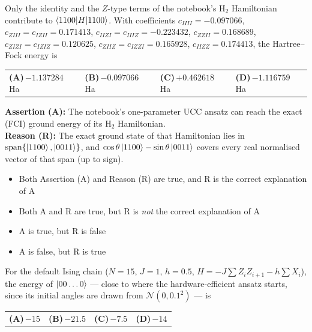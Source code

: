 \documentclass[11pt,a4paper]{article}
\newcommand{\optlabel}[1]{\textbf{(#1)}}
\newenvironment{qitem}[1]{\begin{list}{}{\setlength{\leftmargin}{3.3em}\setlength{\labelwidth}{3.1em}%
  \setlength{\labelsep}{0.2em}\setlength{\topsep}{3pt}\setlength{\parsep}{3pt}}\item[\textbf{Q.#1}\hfill]}{\end{list}}
\newcommand{\qsep}{\par\vspace{2pt}{\color{black!15}\hrule}\vspace{4pt}}
\begin{document}
\begin{qitem}{48}
Only the identity and the $Z$-type terms of the notebook's H$_2$ Hamiltonian contribute to $\braket{1100|H|1100}$. With coefficients
$c_{IIII} = -0.097066$, $c_{ZIII} = c_{IZII} = 0.171413$, $c_{IIZI} = c_{IIIZ} = -0.223432$, $c_{ZZII} = 0.168689$, $c_{ZIZI} = c_{IZIZ} = 0.120625$,
$c_{ZIIZ} = c_{IZZI} = 0.165928$, $c_{IIZZ} = 0.174413$, the Hartree--Fock energy is
\par\smallskip\noindent\begin{tabularx}{\linewidth}{@{}*{4}{L}@{}}
\optlabel{A}\,$-1.137284$ Ha & \optlabel{B}\,$-0.097066$ Ha & \optlabel{C}\,$+0.462618$ Ha & \optlabel{D}\,$-1.116759$ Ha
\end{tabularx}
\end{qitem}
\qsep

\begin{qitem}{49}
\textbf{Assertion (A):} The notebook's one-parameter UCC ansatz can reach the exact (FCI) ground energy of its H$_2$ Hamiltonian.\\[1mm]
\textbf{Reason (R):} The exact ground state of that Hamiltonian lies in $\mathrm{span}\{\ket{1100}, \ket{0011}\}$, and $\cos\theta\ket{1100} - \sin\theta\ket{0011}$ covers every
real normalised vector of that span (up to sign).
\begin{itemize}[leftmargin=2.6em, labelsep=0.4em, itemsep=2pt, topsep=3pt]
\item[\optlabel{A}] Both Assertion (A) and Reason (R) are true, and R is the correct explanation of A
\item[\optlabel{B}] Both A and R are true, but R is \emph{not} the correct explanation of A
\item[\optlabel{C}] A is true, but R is false
\item[\optlabel{D}] A is false, but R is true
\end{itemize}
\end{qitem}
\qsep

\begin{qitem}{50}
For the default Ising chain ($N = 15$, $J = 1$, $h = 0.5$, $H = -J\sum Z_iZ_{i+1} - h\sum X_i$), the energy of $\ket{00\dots0}$ --- close to where the
hardware-efficient ansatz starts, since its initial angles are drawn from $\mathcal N(0, 0.1^2)$ --- is
\par\smallskip\noindent\begin{tabularx}{\linewidth}{@{}*{4}{L}@{}}
\optlabel{A}\,$-15$ & \optlabel{B}\,$-21.5$ & \optlabel{C}\,$-7.5$ & \optlabel{D}\,$-14$
\end{tabularx}
\end{qitem}
\qsep
\end{document}
